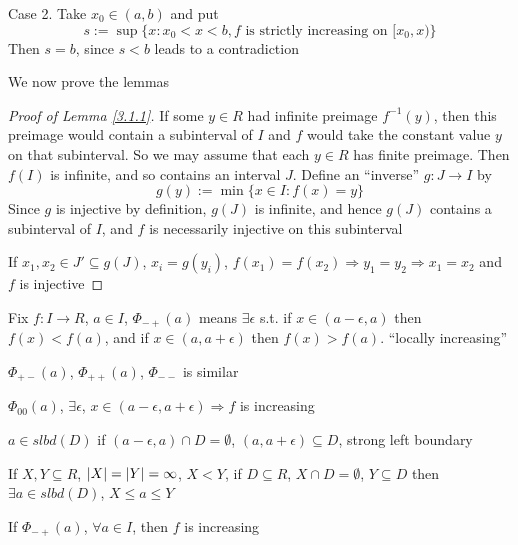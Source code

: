 \documentclass[11pt]{article}
\begin{document}
Case 2. Take \(x_0\in(a,b)\) and put
\begin{equation*}
s:=\sup\{x:x_0<x<b,f\text{ is strictly increasing on }[x_0,x)\}
\end{equation*}
Then \(s=b\), since \(s<b\) leads to a contradiction

We now prove the lemmas

\begin{proof}[Proof of Lemma \ref{3.1.1}]
If some \(y\in R\) had infinite preimage \(f^{-1}(y)\), then this preimage would contain a
subinterval of \(I\) and \(f\) would take the constant value \(y\) on that subinterval. So we
may assume that each \(y\in R\) has finite preimage. Then \(f(I)\) is infinite, and so contains an
interval \(J\). Define an ``inverse'' \(g:J\to I\) by
\begin{equation*}
g(y):=\min\{x\in I:f(x)=y\}
\end{equation*}
Since \(g\) is injective by definition, \(g(J)\) is infinite, and hence \(g(J)\) contains a
subinterval of \(I\), and \(f\) is necessarily injective on this subinterval

If \(x_1,x_2\in J'\subseteq g(J)\), \(x_i=g(y_i)\), \(f(x_1)=f(x_2)\Rightarrow y_1=y_2\Rightarrow x_1=x_2\) and \(f\) is injective
\end{proof}
Fix \(f:I\to R\), \(a\in I\),  \(\Phi_{-+}(a)\) means \(\exists\epsilon\) s.t. if \(x\in(a-\epsilon,a)\) then \(f(x)<f(a)\),
and if \(x\in(a,a+\epsilon)\) then \(f(x)>f(a)\). ``locally increasing''

\(\Phi_{+-}(a)\), \(\Phi_{++}(a)\), \(\Phi_{--}\) is similar

\(\Phi_{00}(a)\), \(\exists\epsilon\), \(x\in(a-\epsilon,a+\epsilon)\Rightarrow f\) is increasing

\begin{definition}[]
\(a\in slbd(D)\) if \((a-\epsilon,a)\cap D=\emptyset\), \((a,a+\epsilon)\subseteq D\), strong left boundary
\end{definition}

\begin{fact}[]
If \(X,Y\subseteq R\), \(\abs{X}=\abs{Y}=\infty\), \(X<Y\), if \(D\subseteq R\), \(X\cap D=\emptyset\), \(Y\subseteq D\)
then \(\exists a\in slbd(D)\), \(X\le a\le Y\)
\end{fact}


\begin{lemma}[]
If \(\Phi_{-+}(a)\), \(\forall a\in I\), then \(f\) is increasing
\end{lemma}
\end{document}

